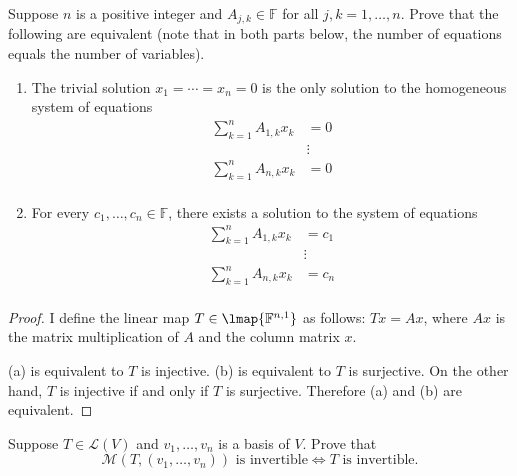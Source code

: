\begin{exercise}
    Suppose $n$ is a positive integer and $A_{j, k} \in \mathbb{F}$ for all $j, k = 1, \ldots, n$. Prove that the following are equivalent (note that in both parts below, the number of equations equals the number of variables).
    \begin{enumerate}[label={(\alph*)}]
        \item The trivial solution $x_{1} = \cdots = x_{n} = 0$ is the only solution to the homogeneous system of equations
              \begin{align*}
                  \sum^{n}_{k=1} A_{1,k}x_{k} & = 0    \\
                                              & \vdots \\
                  \sum^{n}_{k=1} A_{n,k}x_{k} & = 0    \\
              \end{align*}
        \item For every $c_{1}, \ldots, c_{n}\in\mathbb{F}$, there exists a solution to the system of equations
              \begin{align*}
                  \sum^{n}_{k=1} A_{1,k}x_{k} & = c_{1} \\
                                              & \vdots  \\
                  \sum^{n}_{k=1} A_{n,k}x_{k} & = c_{n} \\
              \end{align*}
    \end{enumerate}
\end{exercise}

\begin{proof}
    I define the linear map $T\in\lmap{\mathbb{F}^{n,1}}$ as follows: $Tx = Ax$, where $Ax$ is the matrix multiplication of $A$ and the column matrix $x$.

    (a) is equivalent to $T$ is injective. (b) is equivalent to $T$ is surjective. On the other hand, $T$ is injective if and only if $T$ is surjective. Therefore (a) and (b) are equivalent.
\end{proof}
\newpage

\begin{exercise}
    Suppose $T\in\mathcal{L}(V)$ and $v_{1},\ldots, v_{n}$ is a basis of $V$. Prove that
    \[
    \text{$\mathcal{M}(T, (v_{1}, \ldots, v_{n}))$ is invertible}\Longleftrightarrow \text{$T$ is invertible.}
    \]
\end{exercise}

